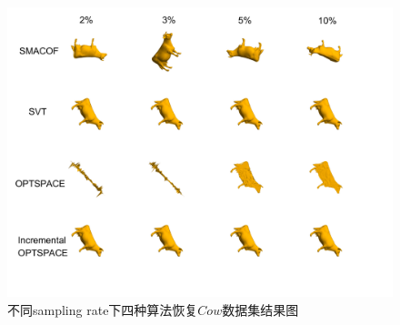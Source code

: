 \begin{figure}[h]
	\centering
	\includegraphics[width=1.0\textwidth]{figure/CowPlot.png}
	\caption{不同sampling rate下四种算法恢复$Cow$数据集结果图}
 	\label{fig:cow}
\end{figure}